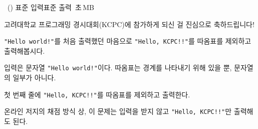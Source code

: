 \begin{problem}{\kcpcpprobkcpc\ (\kcpcpprobkcpcshort)}
    {표준 입력}{표준 출력}
    {\kcpcpprobkcpctime\,초}{\kcpcpprobkcpcmemory\,MB}{}
    
    고려대학교 프로그래밍 경시대회(KCPC)에 참가하게 되신 걸 진심으로 축하드립니다!
    
    \texttt{"Hello world!"}를 처음 출력했던 마음으로 \texttt{"Hello, KCPC!!"}를 따옴표를 제외하고 출력해봅시다.
    
    \InputFile
    입력은 문자열 \texttt{"Hello world!"}이다. 따옴표는 경계를 나타내기 위해 있을 뿐, 문자열의 일부가 아니다.
    
    \OutputFile
    첫 번째 줄에 \texttt{"Hello, KCPC!!"}를 따옴표를 제외하고 출력한다.
   
    \Examples
    
    \begin{example}
    \end{example}
    \Note
    온라인 저지의 채점 방식 상, 이 문제는 입력을 받지 않고 \texttt{"Hello, KCPC!!"}만 출력해도 된다.
\end{problem}

